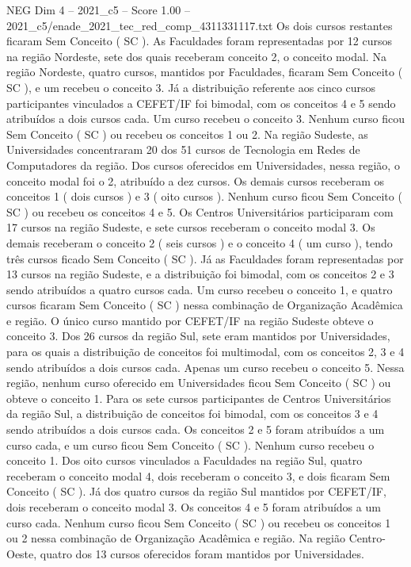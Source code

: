 \begin{textsample}{NEG Dim 4 – 2021\_c5 – Score 1.00 – 2021\_c5/enade\_2021\_tec\_red\_comp\_4311331117.txt}
Os dois cursos restantes ficaram Sem Conceito ( SC ).
As Faculdades foram representadas por 12 cursos na região Nordeste, sete dos quais receberam conceito 2, o conceito modal.
Na região Nordeste, quatro cursos, mantidos por Faculdades, ficaram Sem Conceito ( SC ), e um recebeu o conceito 3.
Já a distribuição referente aos cinco cursos participantes vinculados a CEFET/IF foi bimodal, com os conceitos 4 e 5 sendo atribuídos a dois cursos cada.
Um curso recebeu o conceito 3.
Nenhum curso ficou Sem Conceito ( SC ) ou recebeu os conceitos 1 ou 2.
Na região Sudeste, as Universidades concentraram 20 dos 51 cursos de Tecnologia em Redes de Computadores da região.
Dos cursos oferecidos em Universidades, nessa região, o conceito modal foi o 2, atribuído a dez cursos.
Os demais cursos receberam os conceitos 1 ( dois cursos ) e 3 ( oito cursos ).
Nenhum curso ficou Sem Conceito ( SC ) ou recebeu os conceitos 4 e 5.
Os Centros Universitários participaram com 17 cursos na região Sudeste, e sete cursos receberam o conceito modal 3.
Os demais receberam o conceito 2 ( seis cursos ) e o conceito 4 ( um curso ), tendo três cursos ficado Sem Conceito ( SC ).
Já as Faculdades foram representadas por 13 cursos na região Sudeste, e a distribuição foi bimodal, com os conceitos 2 e 3 sendo atribuídos a quatro cursos cada.
Um curso recebeu o conceito 1, e quatro cursos ficaram Sem Conceito ( SC ) nessa combinação de Organização Acadêmica e região.
O único curso mantido por CEFET/IF na região Sudeste obteve o conceito 3.
Dos 26 cursos da região Sul, sete eram mantidos por Universidades, para os quais a distribuição de conceitos foi multimodal, com os conceitos 2, 3 e 4 sendo atribuídos a dois cursos cada.
Apenas um curso recebeu o conceito 5.
Nessa região, nenhum curso oferecido em Universidades ficou Sem Conceito ( SC ) ou obteve o conceito 1.
Para os sete cursos participantes de Centros Universitários da região Sul, a distribuição de conceitos foi bimodal, com os conceitos 3 e 4 sendo atribuídos a dois cursos cada.
Os conceitos 2 e 5 foram atribuídos a um curso cada, e um curso ficou Sem Conceito ( SC ).
Nenhum curso recebeu o conceito 1.
Dos oito cursos vinculados a Faculdades na região Sul, quatro receberam o conceito modal 4, dois receberam o conceito 3, e dois ficaram Sem Conceito ( SC ).
Já dos quatro cursos da região Sul mantidos por CEFET/IF, dois receberam o conceito modal 3.
Os conceitos 4 e 5 foram atribuídos a um curso cada.
Nenhum curso ficou Sem Conceito ( SC ) ou recebeu os conceitos 1 ou 2 nessa combinação de Organização Acadêmica e região.
Na região Centro-Oeste, quatro dos 13 cursos oferecidos foram mantidos por Universidades.

\end{textsample}
